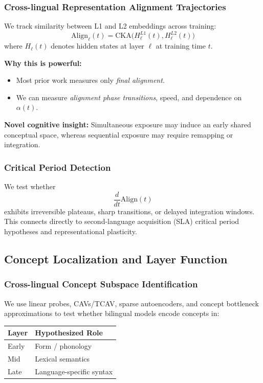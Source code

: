 \subsubsection{Cross-lingual Representation Alignment Trajectories}

We track similarity between L1 and L2 embeddings across training:
\begin{equation}
\text{Align}_\ell(t) = \text{CKA}\big(H_\ell^{L1}(t), H_\ell^{L2}(t)\big)
\end{equation}
where $H_\ell(t)$ denotes hidden states at layer $\ell$ at training time $t$.  

\textbf{Why this is powerful:}
\begin{itemize}
    \item Most prior work measures only \emph{final alignment}.
    \item We can measure \emph{alignment phase transitions}, speed, and dependence on $\alpha(t)$.
\end{itemize}

\textbf{Novel cognitive insight:}  
Simultaneous exposure may induce an early shared conceptual space, whereas sequential exposure may require remapping or integration.

\subsubsection{Critical Period Detection}

We test whether
\begin{equation}
\frac{d}{dt} \text{Align}(t)
\end{equation}
exhibits irreversible plateaus, sharp transitions, or delayed integration windows.  
This connects directly to second-language acquisition (SLA) critical period hypotheses and representational plasticity.

\subsection{Concept Localization and Layer Function}

\subsubsection{Cross-lingual Concept Subspace Identification}

We use linear probes, CAVs/TCAV, sparse autoencoders, and concept bottleneck approximations to test whether bilingual models encode concepts in:
\begin{center}
\begin{tabular}{ll}
\toprule
\textbf{Layer} & \textbf{Hypothesized Role} \\
\midrule
Early & Form / phonology \\
Mid   & Lexical semantics \\
Late  & Language-specific syntax \\
\bottomrule
\end{tabular}
\end{center}

